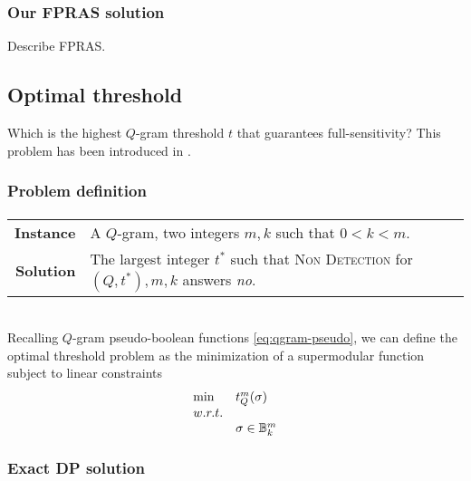\subsubsection{Our FPRAS solution}


Describe FPRAS.


\subsection{Optimal threshold}

Which is the highest $Q$-gram threshold $t$ that guarantees full-sensitivity?
This problem has been introduced in \citep{Burkhardt2001}. %

\subsubsection{Problem definition}

\paragraph{}
\begin{tabular}{rl}
{\bf Instance}	&	A $Q$-gram, two integers $m,k$ such that $0 < k < m$.\\
{\bf Solution}	&	The largest integer $t^*$ such that \textsc{Non Detection} for $(Q,t^*),m,k$ answers \emph{no}.\\
\end{tabular}
\\

Recalling $Q$-gram pseudo-boolean functions \ref{eq:qgram-pseudo}, we can define the optimal threshold problem as the minimization of a supermodular function subject to linear constraints
\begin{equation}
\begin{array}{ll}
\text{min} & t_{Q}^{m} (\sigma)			\\
w.r.t.								\\
& \sigma \in \mathbb {B}^m_k				\\
\end{array}
\end{equation}

\subsubsection{Exact DP solution}

